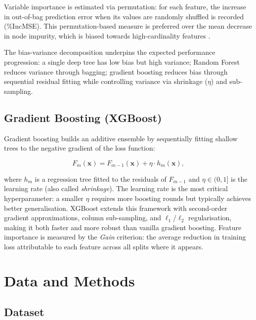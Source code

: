 \documentclass[10pt, twocolumn]{article}
\begin{document}
Variable importance is estimated via permutation: for each feature, the
increase in out-of-bag prediction error when its values are randomly
shuffled is recorded (\%IncMSE). This permutation-based measure is
preferred over the mean decrease in node impurity, which is biased towards
high-cardinality features \citep{breiman2001}.

The bias-variance decomposition underpins the expected performance
progression: a single deep tree has low bias but high variance;
Random Forest reduces variance through bagging; gradient boosting
reduces bias through sequential residual fitting while controlling
variance via shrinkage ($\eta$) and sub-sampling.

\subsection{Gradient Boosting (XGBoost)}
\label{subsec:xgb}

Gradient boosting \citep{friedman2001} builds an additive ensemble by
sequentially fitting shallow trees to the negative gradient of the loss
function:

\begin{equation}
  F_m(\mathbf{x}) = F_{m-1}(\mathbf{x}) + \eta \cdot h_m(\mathbf{x}),
  \label{eq:gb_update}
\end{equation}

where $h_m$ is a regression tree fitted to the residuals of $F_{m-1}$
and $\eta \in (0,1]$ is the learning rate (also called \emph{shrinkage}).
The learning rate is the most critical hyperparameter: a smaller $\eta$
requires more boosting rounds but typically achieves better generalisation.
XGBoost \citep{chen2016} extends this framework with second-order gradient
approximations, column sub-sampling, and $\ell_1$/$\ell_2$ regularisation,
making it both faster and more robust than vanilla gradient boosting.
Feature importance is measured by the \emph{Gain} criterion: the average
reduction in training loss attributable to each feature across all splits
where it appears.

\section{Data and Methods}
\label{sec:methods}

\subsection{Dataset}
\label{subsec:data}
\end{document}
